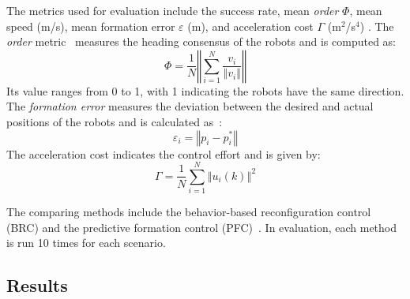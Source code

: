 The metrics used for evaluation include the success rate, mean \textit{order} $\Phi$, mean speed (m/s), mean formation error $\varepsilon$ (m), and acceleration cost $\Gamma$ (m$^2$/s$^4$) \cite{Zhang2021}. The \textit{order} metric~\cite{Vicsek1995} measures the heading consensus of the robots and is computed as:
\begin{equation}
    \Phi=\dfrac{1}{N}\left\Vert\sum_{i=1}^N{\dfrac{v_i}{\left\Vert v_i\right\Vert}}\right\Vert
\end{equation}
Its value ranges from 0 to 1, with 1 indicating the robots have the same direction. The \textit{formation error} measures the deviation between the desired and actual positions of the robots and is calculated as~\cite{6798711}:
\begin{equation}
    \varepsilon_i = \left\Vert p_i-p^*_i\right\Vert
\end{equation} 
The acceleration cost indicates the control effort and is given by:
\begin{equation}
    \Gamma = \dfrac{1}{N}\sum_{i=1}^N{\left\Vert u_i(k)\right\Vert^2}
\end{equation} 

The comparing methods include the behavior-based reconfiguration control (BRC) \cite{Vsrhelyi2018} and the predictive formation control (PFC)~\cite{9562281}. In evaluation, each method is run 10 times for each scenario.   

\subsection{Results}
\label{subsec:results}

